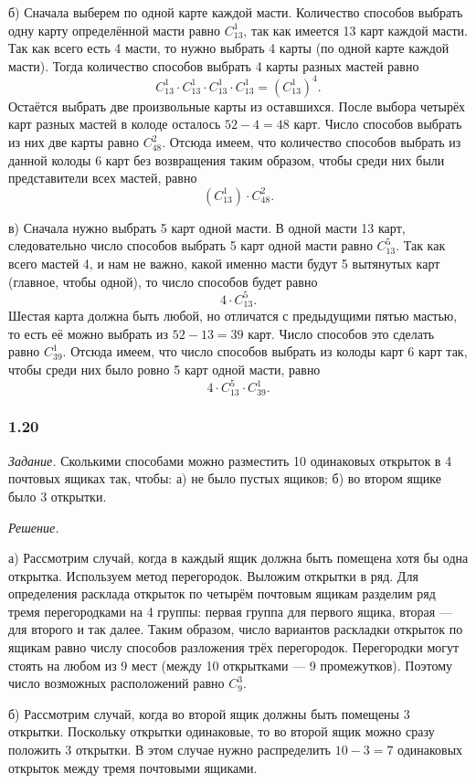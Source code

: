 \documentclass{book}
\begin{document}
б) Сначала выберем по одной карте каждой масти. Количество способов выбрать одну карту определённой масти равно $C_{13}^1$, так как имеется 13 карт каждой масти. Так как всего есть 4 масти, то нужно выбрать 4 карты (по одной карте каждой масти). Тогда количество способов выбрать 4 карты разных мастей равно $$C_{13}^1\cdot C_{13}^1\cdot C_{13}^1\cdot C_{13}^1=\left(C_{13}^1\right)^4.$$ Остаётся выбрать две произвольные карты из оставшихся. После выбора четырёх карт разных мастей в колоде осталось $52-4=48$ карт. Число способов выбрать из них две карты равно $C_{48}^2$. Отсюда имеем, что количество способов выбрать из данной колоды 6 карт без возвращения таким образом, чтобы среди них были представители всех мастей, равно $$\left(C_{13}^1\right)\cdot C_{48}^2.$$

в) Сначала нужно выбрать 5 карт одной масти. В одной масти 13 карт, следовательно число способов выбрать 5 карт одной масти равно $C_{13}^5$. Так как всего мастей 4, и нам не важно, какой именно масти будут 5 вытянутых карт (главное, чтобы одной), то число способов будет равно $$4\cdot C_{13}^5.$$ Шестая карта должна быть любой, но отличатся с предыдущими пятью мастью, то есть её можно выбрать из $52-13=39$ карт. Число способов это сделать равно $C_{39}^1$. Отсюда имеем, что число способов выбрать из колоды карт 6 карт так, чтобы среди них было ровно 5 карт одной масти, равно $$4\cdot C_{13}^5\cdot C_{39}^1.$$

\subsubsection*{1.20}

\textit{Задание.} Сколькими способами можно разместить 10 одинаковых открыток в 4 почтовых ящиках так, чтобы: а) не было пустых ящиков; б) во втором ящике было 3 открытки.

\textit{Решение.}

а) Рассмотрим случай, когда в каждый ящик должна быть помещена хотя бы одна открытка. Используем метод перегородок. Выложим открытки в ряд. Для определения расклада открыток по четырём почтовым ящикам разделим ряд тремя перегородками на 4 группы: первая группа для первого ящика, вторая --- для второго и так далее. Таким образом, число вариантов раскладки открыток по ящикам равно числу способов разложения трёх перегородок. Перегородки могут стоять на любом из 9 мест (между 10 открытками --- 9 промежутков). Поэтому число возможных расположений равно $C_9^3$.

б) Рассмотрим случай, когда во второй ящик должны быть помещены 3 открытки. Поскольку открытки одинаковые, то во второй ящик можно сразу положить 3 открытки. В этом случае нужно распределить $10-3=7$ одинаковых открыток между тремя почтовыми ящиками.
\end{document}
